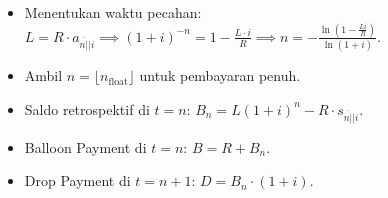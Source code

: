 \documentclass[11pt,a4paper]{article}
\newcommand{\angl}[1]{\overline{#1|}}
\begin{document}
\begin{petunjukbox}
\begin{itemize}[leftmargin=4mm, topsep=1pt, itemsep=1pt]
    \item Menentukan waktu pecahan: $L = R \cdot a_{\angl{n}|i} \implies (1+i)^{-n} = 1 - \frac{L \cdot i}{R} \implies n = -\frac{\ln\left(1 - \frac{Li}{R}\right)}{\ln(1+i)}$.
    \item Ambil $n = \lfloor n_{\text{float}} \rfloor$ untuk pembayaran penuh.
    \item Saldo retrospektif di $t=n$: $B_n = L(1+i)^n - R \cdot s_{\angl{n}|i}$.
    \item Balloon Payment di $t=n$: $B = R + B_n$.
    \item Drop Payment di $t=n+1$: $D = B_n \cdot (1+i)$.
\end{itemize}
\end{petunjukbox}
\end{document}
